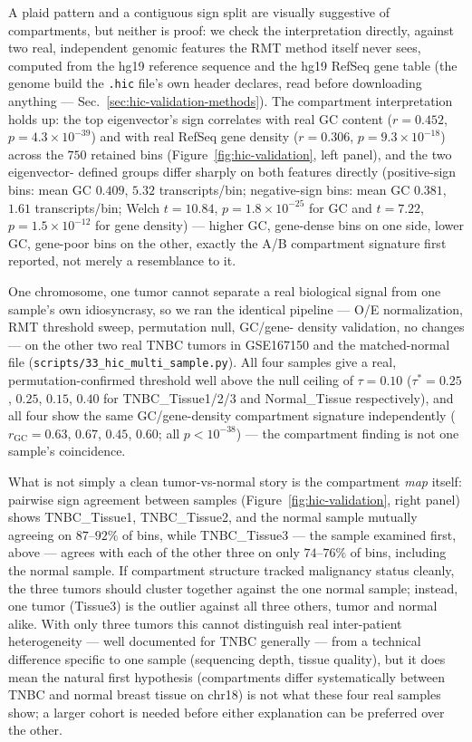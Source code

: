 \documentclass[11pt]{article}
\begin{document}
A plaid pattern and a contiguous sign split are visually suggestive of
compartments, but neither is proof: we check the interpretation
directly, against two real, independent genomic
features the RMT method itself never sees, computed from the hg19
reference sequence and the hg19 RefSeq gene table (the genome build the
\texttt{.hic} file's own header declares, read before downloading
anything --- Sec.~\ref{sec:hic-validation-methods}). The compartment interpretation
holds up: the top eigenvector's sign correlates with real GC content
($r=0.452$, $p=4.3\times10^{-39}$) and with real RefSeq gene density
($r=0.306$, $p=9.3\times10^{-18}$) across the $750$ retained bins
(Figure~\ref{fig:hic-validation}, left panel), and the two eigenvector-
defined groups differ sharply on both features directly (positive-sign
bins: mean GC $0.409$, $5.32$ transcripts/bin; negative-sign bins: mean
GC $0.381$, $1.61$ transcripts/bin; Welch $t=10.84$, $p=1.8\times
10^{-25}$ for GC and $t=7.22$, $p=1.5\times10^{-12}$ for gene density)
--- higher GC, gene-dense bins on one side, lower GC, gene-poor bins on
the other, exactly the A/B compartment signature
\citet{liebermanaiden2009} first reported, not merely a resemblance to
it.

One chromosome, one tumor cannot separate a real biological signal from
one sample's own idiosyncrasy, so we ran the identical pipeline ---
O/E normalization, RMT threshold sweep, permutation null, GC/gene-
density validation, no changes --- on the other two real TNBC tumors in
GSE167150 and the matched-normal file
(\texttt{scripts/33\_hic\_multi\_sample.py}). All four samples give a
real, permutation-confirmed threshold well above the null ceiling of
$\tau=0.10$ ($\tau^*=0.25$, $0.25$, $0.15$, $0.40$ for
TNBC\_Tissue1/2/3 and Normal\_Tissue respectively), and all four show
the same GC/gene-density compartment signature independently
($r_{\text{GC}}=0.63$, $0.67$, $0.45$, $0.60$; all
$p<10^{-38}$) --- the compartment finding is not one sample's
coincidence.

What is not simply a clean tumor-vs-normal story is the compartment
\emph{map} itself: pairwise sign agreement between samples
(Figure~\ref{fig:hic-validation}, right panel) shows TNBC\_Tissue1,
TNBC\_Tissue2, and the normal sample mutually agreeing on $87$--$92\%$
of bins, while TNBC\_Tissue3 --- the sample examined first, above ---
agrees with each of the other three on only $74$--$76\%$ of bins,
including the normal sample. If compartment structure tracked
malignancy status cleanly, the three tumors should cluster together
against the one normal sample; instead, one tumor (Tissue3) is the
outlier against all three others, tumor and normal alike. With only
three tumors this cannot distinguish real inter-patient heterogeneity
--- well documented for TNBC generally \citep{foulkes2010} --- from a
technical difference specific to one sample (sequencing depth, tissue
quality), but it does mean the natural first hypothesis (compartments
differ systematically between TNBC and normal breast tissue on chr18)
is not what these four real samples show; a larger cohort is needed
before either explanation can be preferred over the other.
\end{document}
